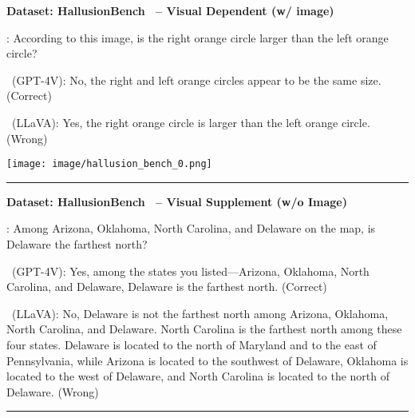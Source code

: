 \begin{boxK}
\small 
\textbf{Dataset: HallusionBench~\cite{HallusionBench} -- Visual Dependent (w/ image)}

\begin{minipage}{0.75\linewidth}
\user: According to this image, is the right orange circle larger than the left orange circle?

\robot\ (GPT-4V): No, the right and left orange circles appear to be the same size. (\textcolor{green!50!black}{Correct})

\robot\ (LLaVA): Yes, the right orange circle is larger than the left orange circle. (\textcolor{red!50!black}{Wrong})

\end{minipage}\hfill
\begin{minipage}{0.22\linewidth}
    \centering
    \texttt{[image: image/hallusion\_bench\_0.png]} 
\end{minipage}



\vspace{2pt}
\hrule
\vspace{2pt}

\textbf{Dataset: HallusionBench~\cite{HallusionBench} -- Visual Supplement (w/o Image)}

\user: Among Arizona, Oklahoma, North Carolina, and Delaware on the map, is Delaware the farthest north?

\robot\ (GPT-4V): Yes, among the states you listed—Arizona, Oklahoma, North Carolina, and Delaware, Delaware is the farthest north. (\textcolor{green!50!black}{Correct})

\robot\ (LLaVA): No, Delaware is not the farthest north among Arizona, Oklahoma, North Carolina, and Delaware. North Carolina is the farthest north among these four states. Delaware is located to the north of Maryland and to the east of Pennsylvania, while Arizona is located to the southwest of Delaware, Oklahoma is located to the west of Delaware, and North Carolina is located to the north of Delaware. (\textcolor{red!50!black}{Wrong})

\vspace{2pt}
\hrule
\vspace{2pt}


\end{boxK}
